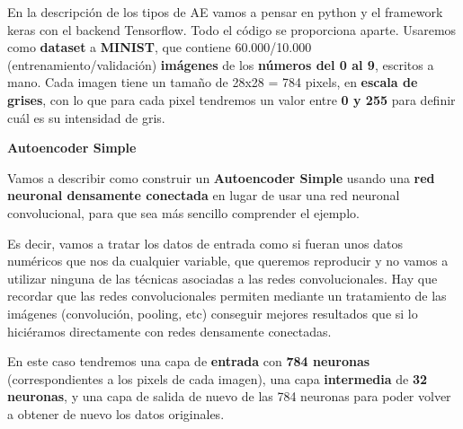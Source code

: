 \documentclass[
  a4paper,
  DIV=11,
  numbers=noendperiod]{scrreprt}
\begin{document}
En la descripción de los tipos de AE vamos a pensar en python y el
framework keras con el backend Tensorflow. Todo el código se proporciona
aparte. Usaremos como \textbf{dataset} a \textbf{MINIST}, que contiene
60.000/10.000 (entrenamiento/validación) \textbf{imágenes} de los
\textbf{números del 0 al 9}, escritos a mano. Cada imagen tiene un
tamaño de 28x28 = 784 pixels, en \textbf{escala de grises}, con lo que
para cada pixel tendremos un valor entre \textbf{0 y 255} para definir
cuál es su intensidad de gris.

\textbf{Autoencoder Simple}

Vamos a describir como construir un \textbf{Autoencoder Simple} usando
una \textbf{red neuronal densamente conectada} en lugar de usar una red
neuronal convolucional, para que sea más sencillo comprender el ejemplo.

Es decir, vamos a tratar los datos de entrada como si fueran unos datos
numéricos que nos da cualquier variable, que queremos reproducir y no
vamos a utilizar ninguna de las técnicas asociadas a las redes
convolucionales. Hay que recordar que las redes convolucionales permiten
mediante un tratamiento de las imágenes (convolución, pooling, etc)
conseguir mejores resultados que si lo hiciéramos directamente con redes
densamente conectadas.

En este caso tendremos una capa de \textbf{entrada} con \textbf{784
neuronas} (correspondientes a los pixels de cada imagen), una capa
\textbf{intermedia} de \textbf{32 neuronas}, y una capa de salida de
nuevo de las 784 neuronas para poder volver a obtener de nuevo los datos
originales.
\end{document}
